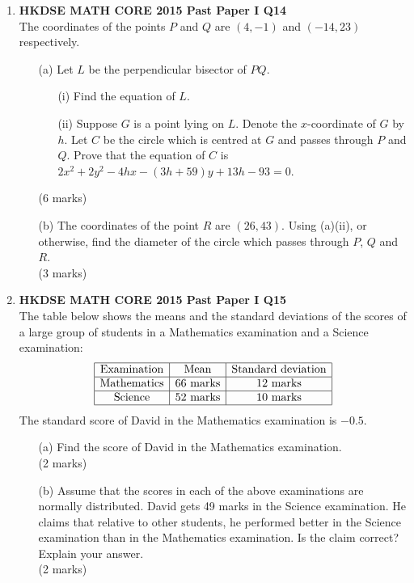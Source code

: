 \documentclass[12pt]{article}
\begin{document}
\begin{enumerate}
	\item \textbf{HKDSE MATH CORE 2015 Past Paper I Q14}\\
	The coordinates of the points $P$ and $Q$ are $(4, -1)$ and $(-14, 23)$ respectively.
	\begin{enumerate}
		\item[(a)] Let $L$ be the perpendicular bisector of $PQ$.
		\begin{enumerate}
			\item[(i)] Find the equation of $L$.
			\item[(ii)] Suppose $G$ is a point lying on $L$. Denote the $x$-coordinate of $G$ by $h$. Let $C$ be the circle which is centred at $G$ and passes through $P$ and $Q$. Prove that the equation of $C$ is $2x^2 + 2y^2 -4hx -(3h+59)y + 13h - 93 = 0$.
		\end{enumerate}
		(6 marks)
		\item[(b)] The coordinates of the point $R$ are $(26, 43)$. Using (a)(ii), or otherwise, find the diameter of the circle which passes through $P$, $Q$ and $R$. \\(3 marks)
	\end{enumerate}

	\item \textbf{HKDSE MATH CORE 2015 Past Paper I Q15}\\
	The table below shows the means and the standard deviations of the scores of a large group of students in a Mathematics examination and a Science examination:
	$$\begin{array}{|c|c|c|}
		\hline
		\text{Examination} & \text{Mean} & \text{Standard deviation} \\
		\hline
		\text{Mathematics} & \text{66 marks} & \text{12 marks} \\
		\hline		
		\text{Science} & \text{52 marks} & \text{10 marks} \\
		\hline
	\end{array}$$
	The standard score of David in the Mathematics examination is $-0.5$.
	\begin{enumerate}
		\item[(a)] Find the score of David in the Mathematics examination. \\(2 marks)
		\item[(b)] Assume that the scores in each of the above examinations are normally distributed. David gets 49 marks in the Science examination. He claims that relative to other students, he performed better in the Science examination than in the Mathematics examination. Is the claim correct? Explain your answer. \\(2 marks)
	\end{enumerate}


\end{enumerate}
\end{document}
